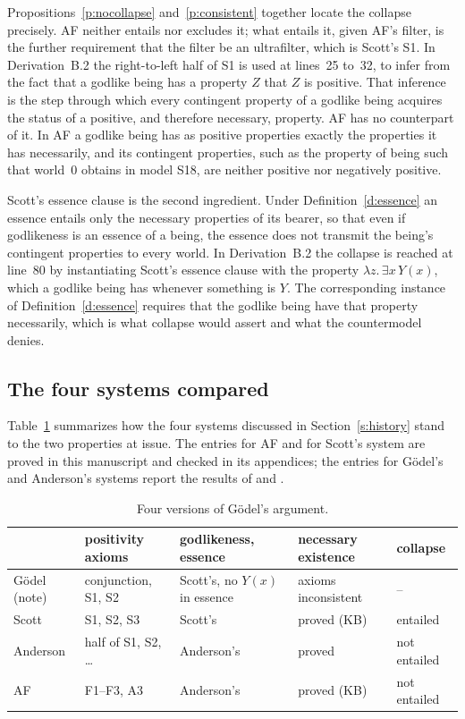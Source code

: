 \documentclass{situationist-preprint}
\begin{document}
Propositions~\ref{p:nocollapse} and~\ref{p:consistent} together locate the collapse precisely. AF neither entails nor excludes it; what entails it, given AF's filter, is the further requirement that the filter be an ultrafilter, which is Scott's S1. In Derivation~B.2 the right-to-left half of S1 is used at lines~25 to~32, to infer from the fact that a godlike being has a property $Z$ that $Z$ is positive. That inference is the step through which every contingent property of a godlike being acquires the status of a positive, and therefore necessary, property. AF has no counterpart of it. In AF a godlike being has as positive properties exactly the properties it has necessarily, and its contingent properties, such as the property of being such that world~0 obtains in model S18, are neither positive nor negatively positive.

Scott's essence clause is the second ingredient. Under Definition~\ref{d:essence} an essence entails only the necessary properties of its bearer, so that even if godlikeness is an essence of a being, the essence does not transmit the being's contingent properties to every world. In Derivation~B.2 the collapse is reached at line~80 by instantiating Scott's essence clause with the property $\lambda z.\,\exists x\,Y(x)$, which a godlike being has whenever something is $Y$. The corresponding instance of Definition~\ref{d:essence} requires that the godlike being have that property necessarily, which is what collapse would assert and what the countermodel denies.

\subsection{The four systems compared}

Table~\ref{tab:systems} summarizes how the four systems discussed in Section~\ref{s:history} stand to the two properties at issue. The entries for AF and for Scott's system are proved in this manuscript and checked in its appendices; the entries for Gödel's and Anderson's systems report the results of \citet{Benzmuller2016} and \citet{Anderson1990}.

\begin{table}[ht]
\caption{Four versions of Gödel's argument.}\label{tab:systems}
\begin{center}\small
\begin{tabular}{@{}lllll@{}}
\toprule
& positivity axioms & godlikeness, essence & necessary existence & collapse \\
\midrule
Gödel (note) & conjunction, S1, S2 & Scott's, no $Y(x)$ in essence & axioms inconsistent & -- \\
Scott & S1, S2, S3 & Scott's & proved (KB) & entailed \\
Anderson & half of S1, S2, \ldots & Anderson's & proved & not entailed \\
AF & F1--F3, A3 & Anderson's & proved (KB) & not entailed \\
\bottomrule
\end{tabular}
\end{center}
\end{table}
\end{document}
